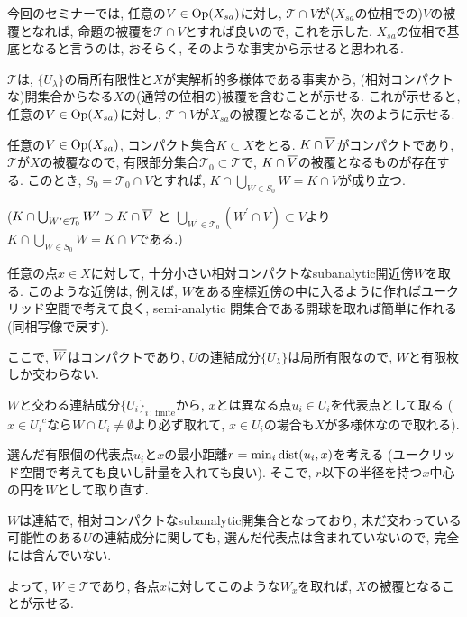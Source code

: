 \documentclass[../main]{subfiles}
\begin{document}
今回のセミナーでは,
任意の$V\in\mathrm{Op}(X_{sa})$に対し,
$\mathcal{T}\cap V$が($X_{sa}$の位相での)$V$の被覆となれば,
命題の被覆を$\mathcal{T}\cap V$とすれば良いので, これを示した.
$X_{sa}$の位相で基底となると言うのは, おそらく, そのような事実から示せると思われる.
\begin{rem*}
  $\mathcal{T}$は,
  $\{U_\lambda\}$の局所有限性と$X$が実解析的多様体である事実から,
  (相対コンパクトな)開集合からなる$X$の(通常の位相の)被覆を含むことが示せる.
  これが示せると,
  任意の$V\in\mathrm{Op}(X_{sa})$に対し,
  $\mathcal{T}\cap V$が$X_{sa}$の被覆となることが,
  次のように示せる.

  任意の$V\in\mathrm{Op}(X_{sa})$, コンパクト集合$K\subset X$をとる.
  $K\cap {\overline{V}}$がコンパクトであり,
  $\mathcal{T}$が$X$の被覆なので,
  有限部分集合$\mathcal{T}_0\subset\mathcal{T}$で,
  $K\cap {\overline{V}}$の被覆となるものが存在する.
  このとき, $S_0 = \mathcal{T}_0\cap V$とすれば,
  $K\cap\bigcup_{W\in S_0}W = K\cap V$が成り立つ.

  ($K\cap\bigcup_{W^\prime \in \mathcal{T}_0}W^\prime \supset K\cap {\overline{V}}$ と
  $\bigcup_{W^\prime \in \mathcal{T}_0}(W^\prime\cap V) \subset V$より
  $K\cap\bigcup_{W\in S_0}W = K\cap V$である.)
\end{rem*}
\begin{rem*}
  任意の点$x\in X$に対して,
  十分小さい相対コンパクトなsubanalytic開近傍$W$を取る.
  このような近傍は, 例えば,
  $W$をある座標近傍の中に入るように作ればユークリッド空間で考えて良く,
  semi-analytic 開集合である開球を取れば簡単に作れる(同相写像で戻す).

  ここで, ${\overline{W}}$はコンパクトであり,
  $U$の連結成分$\{U_\lambda\}$は局所有限なので,
  $W$と有限枚しか交わらない.

  $W$と交わる連結成分$\{U_i\}_{i\,:\,\mathrm{finite}}$から,
  $x$とは異なる点$u_i\in U_i$を代表点として取る
  ($x\in {U_i}^c$なら$W\cap U_i\neq\emptyset$より必ず取れて,
  $x\in U_i$の場合も$X$が多様体なので取れる).

  選んだ有限個の代表点$u_i$と$x$の最小距離$r = \min_i \mathrm{dist}(u_i,x)$を考える
  (ユークリッド空間で考えても良いし計量を入れても良い).
  そこで, $r$以下の半径を持つ$x$中心の円を$W$として取り直す.

  $W$は連結で, 相対コンパクトなsubanalytic開集合となっており,
  未だ交わっている可能性のある$U$の連結成分に関しても,
  選んだ代表点は含まれていないので,
  完全には含んでいない.

  よって, $W\in\mathcal{T}$であり,
  各点$x$に対してこのような$W_x$を取れば,
  $X$の被覆となることが示せる.
\end{rem*}
\end{document}
